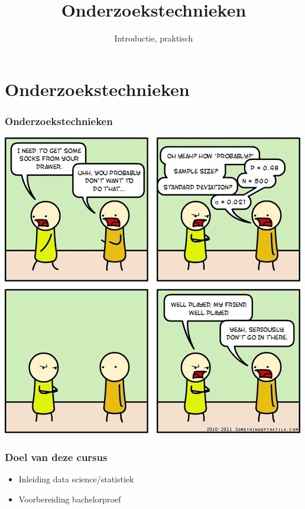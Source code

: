 \documentclass[aspectratio=169]{beamer}
\title[OZT: Intro]{Onderzoekstechnieken}
\subtitle{Introductie, praktisch}
\begin{document}

\begin{frame}
  \maketitle
\end{frame}

\section{Onderzoekstechnieken}

\begin{frame}
  \frametitle{Onderzoekstechnieken}

  \centering
  \includegraphics[height=.8\textheight]{img/intro-01.jpg}
\end{frame}

\begin{frame}
  \frametitle{Doel van deze cursus}
  
  \begin{itemize}
    \item Inleiding data science/statistiek
    \item Voorbereiding bachelorproef
  \end{itemize}
\end{frame}
\end{document}
